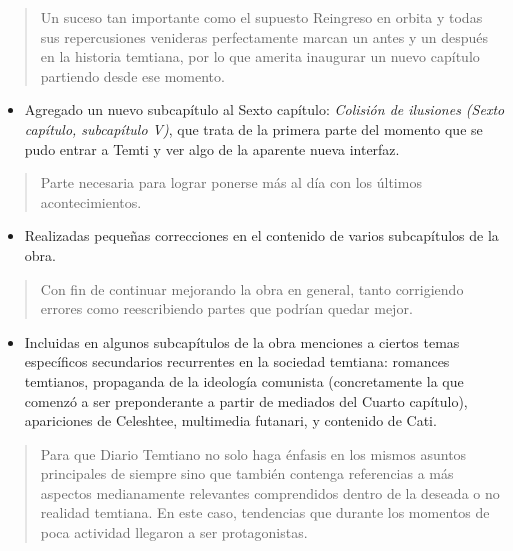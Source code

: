 \documentclass[
]{book}
\providecommand{\tightlist}{%
  \setlength{\itemsep}{0pt}\setlength{\parskip}{0pt}}
\begin{document}
\begin{quote}
Un suceso tan importante como el supuesto Reingreso en orbita y todas sus repercusiones venideras perfectamente marcan un antes y un después en la historia temtiana, por lo que amerita inaugurar un nuevo capítulo partiendo desde ese momento.
\end{quote}

\begin{itemize}
\tightlist
\item
  Agregado un nuevo subcapítulo al Sexto capítulo: \emph{Colisión de ilusiones (Sexto capítulo, subcapítulo V)}, que trata de la primera parte del momento que se pudo entrar a Temti y ver algo de la aparente nueva interfaz.
\end{itemize}

\begin{quote}
Parte necesaria para lograr ponerse más al día con los últimos acontecimientos.
\end{quote}

\begin{itemize}
\tightlist
\item
  Realizadas pequeñas correcciones en el contenido de varios subcapítulos de la obra.
\end{itemize}

\begin{quote}
Con fin de continuar mejorando la obra en general, tanto corrigiendo errores como reescribiendo partes que podrían quedar mejor.
\end{quote}

\begin{itemize}
\tightlist
\item
  Incluidas en algunos subcapítulos de la obra menciones a ciertos temas específicos secundarios recurrentes en la sociedad temtiana: romances temtianos, propaganda de la ideología comunista (concretamente la que comenzó a ser preponderante a partir de mediados del Cuarto capítulo), apariciones de Celeshtee, multimedia futanari, y contenido de Cati.
\end{itemize}

\begin{quote}
Para que Diario Temtiano no solo haga énfasis en los mismos asuntos principales de siempre sino que también contenga referencias a más aspectos medianamente relevantes comprendidos dentro de la deseada o no realidad temtiana. En este caso, tendencias que durante los momentos de poca actividad llegaron a ser protagonistas.
\end{quote}
\end{document}
